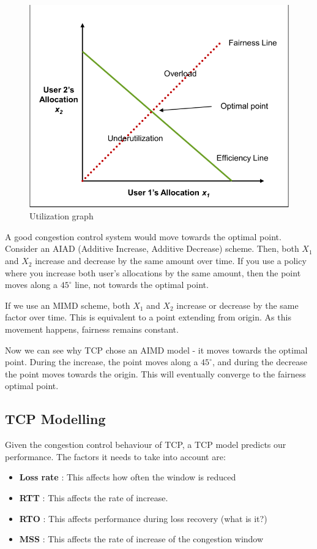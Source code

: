 \documentclass[12pt,letterpaper]{book}
\theoremstyle{definition}
\begin{document}
 \begin{figure}[htpb]
   \centering
   \includegraphics[width=0.5\linewidth]{./assets/util_graph.png}
   \caption{Utilization graph}%
   \label{fig:}
 \end{figure}

 A good congestion control system would move towards the optimal point. Consider an AIAD (Additive Increase, Additive Decrease) scheme. Then, both $X_1$ and $X_2$ increase and decrease by the same amount over time. If you use a policy where you increase both user's allocations by the same amount, then the point moves along a $45^{\circ}$ line, not towards the optimal point.

 If we use an MIMD scheme, both $X_1$ and $X_2$ increase or decrease by the same factor over time. This is equivalent to a point extending from origin. As this movement happens, fairness remains constant.

 Now we can see why TCP chose an AIMD model - it moves towards the optimal point. During the increase, the point moves along a $45^{\circ}$, and during the decrease the point moves towards the origin. This will eventually converge to the fairness optimal point.

\subsection{TCP Modelling}

Given the congestion control behaviour of TCP, a TCP model predicts our performance. The factors it needs to take into account are:
\begin{itemize}
  \item \textbf{Loss rate} : This affects how often the window is reduced
  \item \textbf{RTT} : This affects the rate of increase.
  \item \textbf{RTO} : This affects performance during loss recovery (what is it?)
  \item \textbf{MSS} : This affects the rate of increase of the congestion window
\end{itemize}
\end{document}
